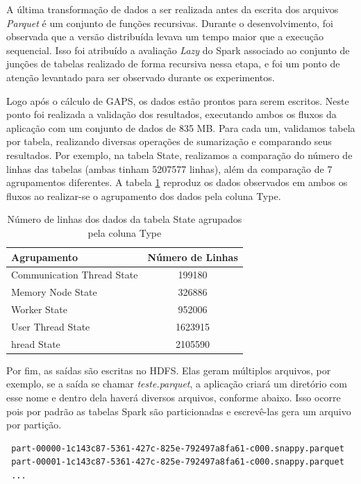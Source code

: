 A última transformação de dados a ser realizada antes da escrita dos arquivos 
\textit{Parquet} é um conjunto de funções recursivas. Durante o desenvolvimento, 
foi observada que a versão distribuída levava um tempo maior que a execução 
sequencial. Isso foi atribuído a avaliação \emph{Lazy} do Spark associado ao 
conjunto de junções de tabelas realizado de forma recursiva nessa etapa, e foi 
um ponto de atenção levantado para ser observado durante os experimentos.

Logo após o cálculo de GAPS, os dados estão prontos para serem escritos. Neste 
ponto foi realizada a validação dos resultados, executando ambos os 
fluxos da aplicação com um conjunto de dados de 835 MB. Para cada um, validamos 
tabela por tabela, realizando diversas operações de sumarização e comparando 
seus resultados. Por exemplo, na tabela State, realizamos a comparação do 
número de linhas das tabelas (ambas tinham 5207577 linhas), além da comparação 
de 7 agrupamentos diferentes. A tabela \ref{tab:validation} reproduz os dados 
observados em ambos os fluxos ao realizar-se o agrupamento dos dados pela coluna 
Type.

\begin{table}[H]
\centering
\begin{tabular}{l c} \toprule
\textbf{Agrupamento}  &  \textbf{Número de Linhas} \\ 
\midrule
Communication Thread State	& 199180 \\
Memory Node State		& 326886 \\
Worker State			& 952006 \\
User Thread State		& 1623915 \\
hread State			& 2105590 \\
\end{tabular}
\caption{Número de linhas dos dados da tabela State agrupados pela coluna Type}
\label{tab:validation}
\end{table}

Por fim, as saídas são escritas no HDFS. Elas geram múltiplos arquivos, por 
exemplo, se a saída se chamar \emph{teste.parquet}, a aplicação criará um 
diretório com esse nome e dentro dela haverá diversos arquivos, conforme abaixo. 
Isso ocorre pois por padrão as tabelas Spark são particionadas e escrevê-las 
gera um arquivo por partição.

\footnotesize
\begin{lstlisting}
 part-00000-1c143c87-5361-427c-825e-792497a8fa61-c000.snappy.parquet
 part-00001-1c143c87-5361-427c-825e-792497a8fa61-c000.snappy.parquet
 ...
\end{lstlisting}






